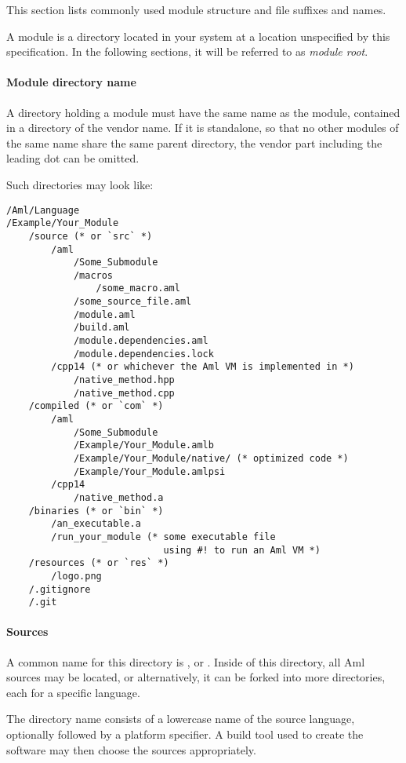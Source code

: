 This section lists commonly used module structure and file suffixes and names. 

A module is a directory located in your system at a location unspecified by this specification. In the following sections, it will be referred to as {\em module root}. 

\paragraph{Module directory name}
A directory holding a module must have the same name as the module, contained in a directory of the vendor name. If it is standalone, so that no other modules of the same name share the same parent directory, the vendor part including the leading dot can be omitted.

\example Such directories may look like:
\begin{lstlisting}[deletekeywords={module,native},mathescape=false]
/Aml/Language
/Example/Your_Module
    /source (* or `src` *)
        /aml
            /Some_Submodule 
            /macros
                /some_macro.aml
            /some_source_file.aml
            /module.aml
            /build.aml
            /module.dependencies.aml
            /module.dependencies.lock
        /cpp14 (* or whichever the Aml VM is implemented in *)
            /native_method.hpp
            /native_method.cpp
    /compiled (* or `com` *)
        /aml
            /Some_Submodule
            /Example/Your_Module.amlb
            /Example/Your_Module/native/ (* optimized code *)
            /Example/Your_Module.amlpsi
        /cpp14
            /native_method.a
    /binaries (* or `bin` *)
        /an_executable.a
        /run_your_module (* some executable file 
                            using #! to run an Aml VM *)
    /resources (* or `res` *)
        /logo.png
    /.gitignore
    /.git
\end{lstlisting} 

\paragraph{Sources}
A common name for this directory is , or . Inside of this directory, all Aml sources may be located, or alternatively, it can be forked into more directories, each for a specific language. 

The directory name consists of a lowercase name of the source language, optionally followed by a platform specifier. A build tool used to create the software may then choose the sources appropriately. 


